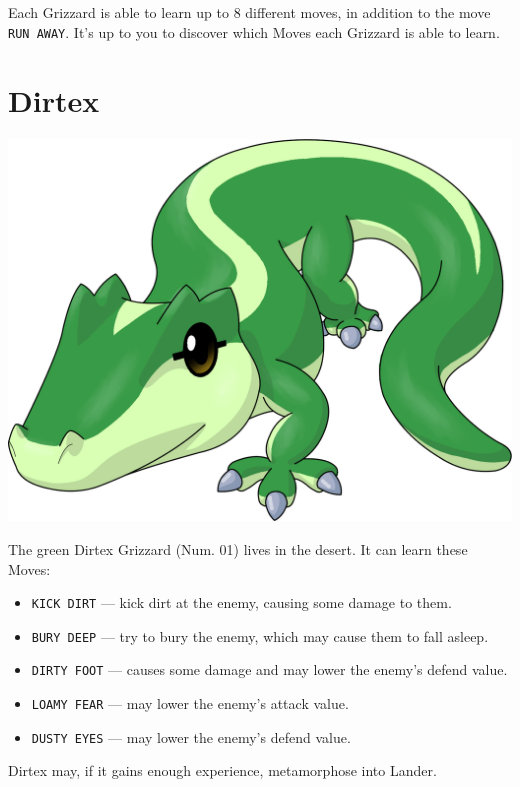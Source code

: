 \documentclass[10pt,twocolumn,openany,article]{memoir}
\begin{document}
\fi

Each Grizzard is able  to learn up to 8 different  moves, in addition to
the move \texttt{RUN AWAY}. It's up  to you to discover which Moves each
Grizzard is able to learn.

\ifdefined\DEMO\else

\section{Dirtex}

\includegraphics[width=\columnwidth]{../Manual/Dirtex.png}

The green  Dirtex Grizzard (Num. 01)  lives in the desert.  It can learn
these Moves:

\begin{itemize}
\item \texttt{KICK DIRT} --- kick dirt at the enemy, causing some damage
  to them.
\item \texttt{BURY DEEP} --- try to bury the enemy, which may cause them
  to fall asleep.
\item  \texttt{DIRTY FOOT}  --- causes  some  damage and  may lower  the
  enemy's defend value.
\item \texttt{LOAMY FEAR} --- may lower the enemy's attack value.
\item \texttt{DUSTY EYES} --- may lower the enemy's defend value.
\end{itemize}

Dirtex may, if it gains enough experience, metamorphose into Lander.

\fi
\end{document}
